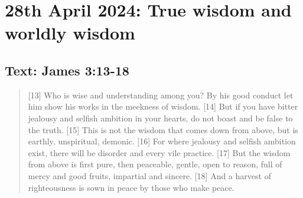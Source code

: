 \setcounter{figure}{0}

\section{28th April 2024: True wisdom and worldly wisdom}
\subsection*{Text: James 3:13-18}
  \begin{quote}
    [13] Who is wise and understanding among you? By his good conduct let him show his works in the meekness of wisdom. [14] But if you have bitter jealousy and selfish ambition in your hearts, do not boast and be false to the truth. [15] This is not the wisdom that comes down from above, but is earthly, unspiritual, demonic. [16] For where jealousy and selfish ambition exist, there will be disorder and every vile practice. [17] But the wisdom from above is first pure, then peaceable, gentle, open to reason, full of mercy and good fruits, impartial and sincere. [18] And a harvest of righteousness is sown in peace by those who make peace.
  \end{quote}
